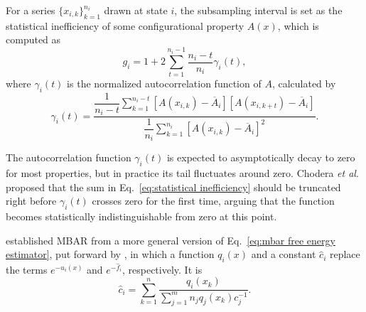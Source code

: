 \documentclass[journal=jctcce,manuscript=article,layout=twocolumn]{achemso}
\newcommand{\avg}[1]{\overline{#1}}             %
\begin{document}
For a series $\{x_{i,k}\}_{k=1}^{n_i}$ drawn at state $i$, the subsampling interval is set as the statistical inefficiency of some configurational property $A(x)$, which is computed as\cite{Chodera_2007}
\begin{equation}
\label{eq:statistical inefficiency}
g_i = 1 + 2 \sum\limits_{t=1}^{n_i-1} \frac{n_i - t}{n_i} \gamma_i(t),
\end{equation}
where $\gamma_i(t)$ is the normalized autocorrelation function of $A$, calculated by
\begin{equation*}
\gamma_i(t) = \frac{\dfrac{1}{n_i - t} \sum\limits_{k=1}^{n_i-t} \left[A(x_{i,k}) - \avg A_i\right]\left[A(x_{i,k+t}) - \avg A_i\right]}{\dfrac{1}{n_i} \sum\limits_{k=1}^{n_i} \left[A(x_{i,k}) - \avg A_i\right]^2}.
\end{equation*}

The autocorrelation function $\gamma_i(t)$ is expected to asymptotically decay to zero for most properties, but in practice its tail fluctuates around zero. Chodera \textit{et al}.\cite{Chodera_2007} proposed that the sum in Eq.~\eqref{eq:statistical inefficiency} should be truncated right before $\gamma_i(t)$ crosses zero for the first time, arguing that the function becomes statistically indistinguishable from zero at this point.

\citeauthor{Shirts_2008} \cite{Shirts_2008} established MBAR from a more general version of Eq.~\eqref{eq:mbar free energy estimator}, put forward by \citeauthor{Kong_2003} \cite{Kong_2003}, in which a function $q_i(x)$ and a constant $\hat c_i$ replace the terms $e^{-u_i(x)}$ and $e^{-\hat f_i}$, respectively. It is
\begin{equation}
\label{eq:mbar general estimator}
{\hat c}_i = \sum_{k=1}^n \frac{q_i(x_k)}{\sum_{j=1}^m n_j q_j(x_k) c_j^{-1}}.
\end{equation}
\end{document}

